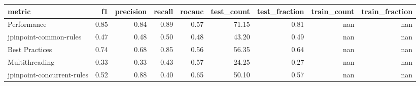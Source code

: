 \begin{tabular}{lrrrrrrrr}
\toprule
metric &   f1 &  precision &  recall &  rocauc &  test\_count &  test\_fraction &  train\_count &  train\_fraction \\
\midrule
Performance                & 0.85 &       0.84 &    0.89 &    0.57 &       71.15 &           0.81 &          nan &             nan \\
jpinpoint-common-rules     & 0.47 &       0.48 &    0.50 &    0.48 &       43.20 &           0.49 &          nan &             nan \\
Best Practices             & 0.74 &       0.68 &    0.85 &    0.56 &       56.35 &           0.64 &          nan &             nan \\
Multithreading             & 0.33 &       0.33 &    0.43 &    0.57 &       24.25 &           0.27 &          nan &             nan \\
jpinpoint-concurrent-rules & 0.52 &       0.88 &    0.40 &    0.65 &       50.10 &           0.57 &          nan &             nan \\
\bottomrule
\end{tabular}
